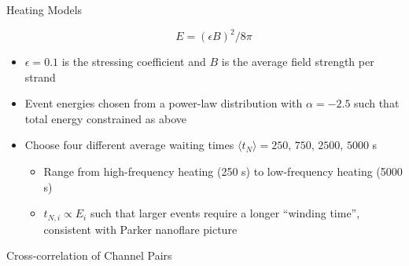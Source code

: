 \documentclass[final]{beamer}
\begin{document}
\begin{frame}
\begin{columns}[T]
\begin{column}{0.49\linewidth}
\begin{block}{Heating Models}
\begin{itemize}
        \begin{equation*}
            E = (\epsilon B)^2/8\pi
        \end{equation*}
        \item $\epsilon=0.1$ is the stressing coefficient and $B$ is the average field strength per strand
        \item Event energies chosen from a power-law distribution with $\alpha=-2.5$ such that total energy constrained as above
        \item Choose four different average waiting times $\langle t_N\rangle=250,\,750,\,2500,\,5000$ s 
        \begin{itemize}
        \item Range from high-frequency heating (250 s) to low-frequency heating (5000 s)
        \item $t_{N,i}\propto E_i$ such that larger events require a longer ``winding time'', consistent with Parker nanoflare picture \citep[e.g.][]{cargill_active_2014,barnes_inference_2016-1}
        \end{itemize}
        \end{itemize}
    \end{block}
    \begin{block}{Cross-correlation of Channel Pairs}
        \begin{columns}[c]
            \begin{column}{0.49\columnwidth}
            \begin{figure}
\end{figure}
\end{column}
\end{columns}
\end{block}
\end{column}
\end{columns}
\end{frame}
\end{document}
